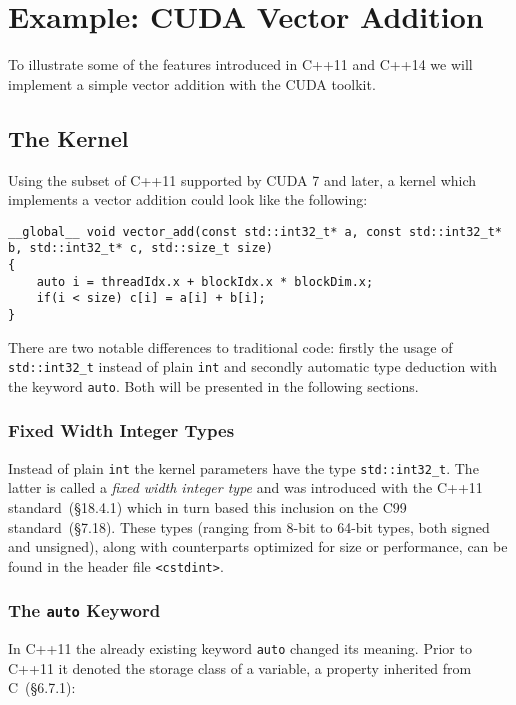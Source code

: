 \section{Example: CUDA Vector Addition}

To illustrate some of the features introduced in C++11 and C++14 we will implement a simple vector addition with the CUDA toolkit.

\subsection{The Kernel}

Using the subset of C++11 supported by CUDA 7 and later, a kernel which implements a vector addition could look like the following:

\begin{lstlisting}
__global__ void vector_add(const std::int32_t* a, const std::int32_t* b, std::int32_t* c, std::size_t size)
{
    auto i = threadIdx.x + blockIdx.x * blockDim.x;
    if(i < size) c[i] = a[i] + b[i];
}
\end{lstlisting}

There are two notable differences to traditional code: firstly the usage of \texttt{std::int32\_t} instead of plain \texttt{int} and secondly automatic type deduction with the keyword \texttt{auto}. Both will be presented in the following sections.

\subsubsection{Fixed Width Integer Types}

Instead of plain \texttt{int} the kernel parameters have the type \texttt{std::int32\_t}. The latter is called a \textit{fixed width integer type} and was introduced with the C++11 standard~\cite{cpp11std}(§18.4.1) which in turn based this inclusion on the C99 standard~\cite{c99std}(§7.18). These types (ranging from 8-bit to 64-bit types, both signed and unsigned), along with counterparts optimized for size or performance, can be found in the header file \texttt{<cstdint>}.

\subsubsection{The \texttt{auto} Keyword}

In C++11 the already existing keyword \texttt{auto} changed its meaning. Prior to C++11 it denoted the storage class of a variable, a property inherited from C~\cite{c99std}(§6.7.1):

